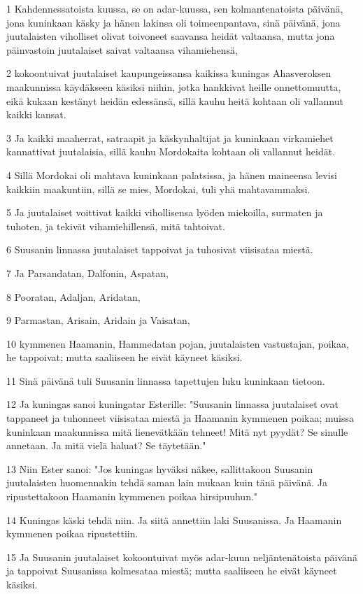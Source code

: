 \par 1 Kahdennessatoista kuussa, se on adar-kuussa, sen kolmantenatoista päivänä, jona kuninkaan käsky ja hänen lakinsa oli toimeenpantava, sinä päivänä, jona juutalaisten viholliset olivat toivoneet saavansa heidät valtaansa, mutta jona päinvastoin juutalaiset saivat valtaansa vihamiehensä,
\par 2 kokoontuivat juutalaiset kaupungeissansa kaikissa kuningas Ahasveroksen maakunnissa käydäkseen käsiksi niihin, jotka hankkivat heille onnettomuutta, eikä kukaan kestänyt heidän edessänsä, sillä kauhu heitä kohtaan oli vallannut kaikki kansat.
\par 3 Ja kaikki maaherrat, satraapit ja käskynhaltijat ja kuninkaan virkamiehet kannattivat juutalaisia, sillä kauhu Mordokaita kohtaan oli vallannut heidät.
\par 4 Sillä Mordokai oli mahtava kuninkaan palatsissa, ja hänen maineensa levisi kaikkiin maakuntiin, sillä se mies, Mordokai, tuli yhä mahtavammaksi.
\par 5 Ja juutalaiset voittivat kaikki vihollisensa lyöden miekoilla, surmaten ja tuhoten, ja tekivät vihamiehillensä, mitä tahtoivat.
\par 6 Suusanin linnassa juutalaiset tappoivat ja tuhosivat viisisataa miestä.
\par 7 Ja Parsandatan, Dalfonin, Aspatan,
\par 8 Pooratan, Adaljan, Aridatan,
\par 9 Parmastan, Arisain, Aridain ja Vaisatan,
\par 10 kymmenen Haamanin, Hammedatan pojan, juutalaisten vastustajan, poikaa, he tappoivat; mutta saaliiseen he eivät käyneet käsiksi.
\par 11 Sinä päivänä tuli Suusanin linnassa tapettujen luku kuninkaan tietoon.
\par 12 Ja kuningas sanoi kuningatar Esterille: "Suusanin linnassa juutalaiset ovat tappaneet ja tuhonneet viisisataa miestä ja Haamanin kymmenen poikaa; muissa kuninkaan maakunnissa mitä lienevätkään tehneet! Mitä nyt pyydät? Se sinulle annetaan. Ja mitä vielä haluat? Se täytetään."
\par 13 Niin Ester sanoi: "Jos kuningas hyväksi näkee, sallittakoon Suusanin juutalaisten huomennakin tehdä saman lain mukaan kuin tänä päivänä. Ja ripustettakoon Haamanin kymmenen poikaa hirsipuuhun."
\par 14 Kuningas käski tehdä niin. Ja siitä annettiin laki Suusanissa. Ja Haamanin kymmenen poikaa ripustettiin.
\par 15 Ja Suusanin juutalaiset kokoontuivat myös adar-kuun neljäntenätoista päivänä ja tappoivat Suusanissa kolmesataa miestä; mutta saaliiseen he eivät käyneet käsiksi.
